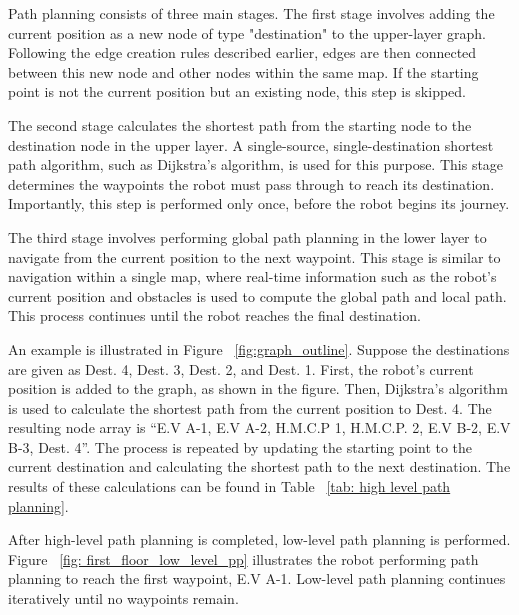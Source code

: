 \documentclass[en]{snu-cse-bsc-thesis}
\begin{document}
Path planning consists of three main stages. The first stage involves adding the current position as a new node of type "destination" to the upper-layer graph. Following the edge creation rules described earlier, edges are then connected between this new node and other nodes within the same map. If the starting point is not the current position but an existing node, this step is skipped.

The second stage calculates the shortest path from the starting node to the destination node in the upper layer. A single-source, single-destination shortest path algorithm, such as Dijkstra’s algorithm, is used for this purpose. This stage determines the waypoints the robot must pass through to reach its destination. Importantly, this step is performed only once, before the robot begins its journey.

The third stage involves performing global path planning in the lower layer to navigate from the current position to the next waypoint. This stage is similar to navigation within a single map, where real-time information such as the robot's current position and obstacles is used to compute the global path and local path. This process continues until the robot reaches the final destination.

An example is illustrated in Figure ~\ref{fig:graph_outline}. Suppose the destinations are given as Dest. 4, Dest. 3, Dest. 2, and Dest. 1. First, the robot's current position is added to the graph, as shown in the figure. Then, Dijkstra’s algorithm is used to calculate the shortest path from the current position to Dest. 4. The resulting node array is “E.V A-1, E.V A-2, H.M.C.P 1, H.M.C.P. 2, E.V B-2, E.V B-3, Dest. 4”. The process is repeated by updating the starting point to the current destination and calculating the shortest path to the next destination. The results of these calculations can be found in Table ~\ref{tab: high level path planning}.

After high-level path planning is completed, low-level path planning is performed. Figure ~\ref{fig: first_floor_low_level_pp} illustrates the robot performing path planning to reach the first waypoint, E.V A-1. Low-level path planning continues iteratively until no waypoints remain.
\end{document}
